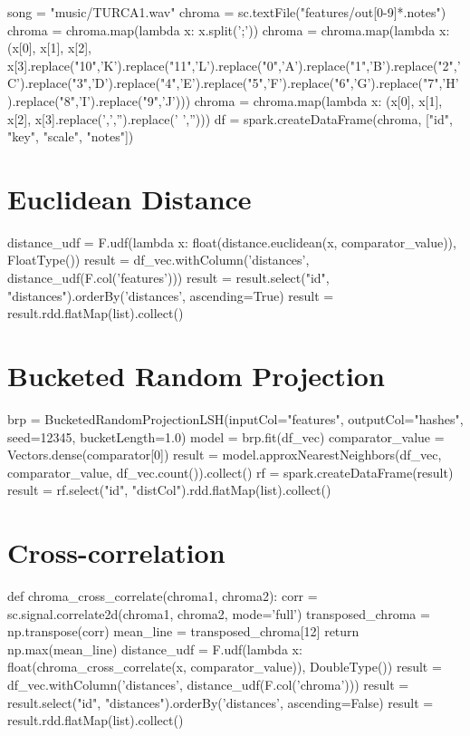 \begin{pythonCode}
song = "music/TURCA1.wav"
chroma = sc.textFile("features/out[0-9]*.notes")
chroma = chroma.map(lambda x: x.split(';'))
chroma = chroma.map(lambda x: (x[0], x[1], x[2], x[3].replace("10",'K').replace("11",'L').replace("0",'A').replace("1",'B').replace("2",'C').replace("3",'D').replace("4",'E').replace("5",'F').replace("6",'G').replace("7",'H').replace("8",'I').replace("9",'J')))
chroma = chroma.map(lambda x: (x[0], x[1], x[2], x[3].replace(',','').replace(' ','')))
df = spark.createDataFrame(chroma, ["id", "key", "scale", "notes"])
\end{pythonCode}

\section{Euclidean Distance}

\begin{pythonCode}
distance_udf = F.udf(lambda x: float(distance.euclidean(x, comparator_value)), FloatType())
result = df_vec.withColumn('distances', distance_udf(F.col('features')))
result = result.select("id", "distances").orderBy('distances', ascending=True)
result = result.rdd.flatMap(list).collect()
\end{pythonCode}

\section{Bucketed Random Projection}

\begin{pythonCode}
brp = BucketedRandomProjectionLSH(inputCol="features", outputCol="hashes", seed=12345, bucketLength=1.0)
model = brp.fit(df_vec)
comparator_value = Vectors.dense(comparator[0])
result = model.approxNearestNeighbors(df_vec, comparator_value, df_vec.count()).collect()
rf = spark.createDataFrame(result)
result = rf.select("id", "distCol").rdd.flatMap(list).collect()
\end{pythonCode}


\section{Cross-correlation}

\begin{pythonCode}
def chroma_cross_correlate(chroma1, chroma2):
    corr = sc.signal.correlate2d(chroma1, chroma2, mode='full') 
    transposed_chroma = np.transpose(corr)
    mean_line = transposed_chroma[12]
    return np.max(mean_line)
distance_udf = F.udf(lambda x: float(chroma_cross_correlate(x, comparator_value)), DoubleType())
result = df_vec.withColumn('distances', distance_udf(F.col('chroma')))
result = result.select("id", "distances").orderBy('distances', ascending=False)
result = result.rdd.flatMap(list).collect()
\end{pythonCode}


